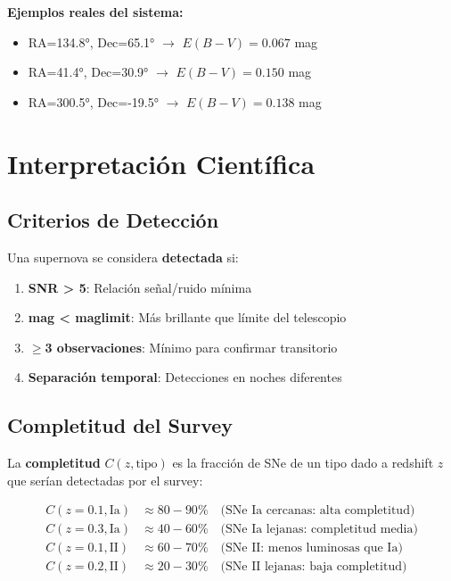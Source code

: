 \documentclass[11pt,a4paper]{article}
\begin{document}
\textbf{Ejemplos reales del sistema:}
\begin{itemize}
    \item RA=134.8°, Dec=65.1° $\rightarrow$ $E(B-V)=0.067$ mag
    \item RA=41.4°, Dec=30.9° $\rightarrow$ $E(B-V)=0.150$ mag
    \item RA=300.5°, Dec=-19.5° $\rightarrow$ $E(B-V)=0.138$ mag
\end{itemize}

\section{Interpretación Científica}

\subsection{Criterios de Detección}

Una supernova se considera \textbf{detectada} si:
\begin{enumerate}
    \item \textbf{SNR > 5}: Relación señal/ruido mínima
    \item \textbf{mag < maglimit}: Más brillante que límite del telescopio
    \item \textbf{$\geq$3 observaciones}: Mínimo para confirmar transitorio
    \item \textbf{Separación temporal}: Detecciones en noches diferentes
\end{enumerate}

\subsection{Completitud del Survey}

La \textbf{completitud} $C(z, \text{tipo})$ es la fracción de SNe de un tipo dado a redshift $z$ que serían detectadas por el survey:

\begin{align}
C(z=0.1, \text{Ia}) &\approx 80-90\% \quad \text{(SNe Ia cercanas: alta completitud)} \\
C(z=0.3, \text{Ia}) &\approx 40-60\% \quad \text{(SNe Ia lejanas: completitud media)} \\
C(z=0.1, \text{II}) &\approx 60-70\% \quad \text{(SNe II: menos luminosas que Ia)} \\
C(z=0.2, \text{II}) &\approx 20-30\% \quad \text{(SNe II lejanas: baja completitud)}
\end{align}
\end{document}
